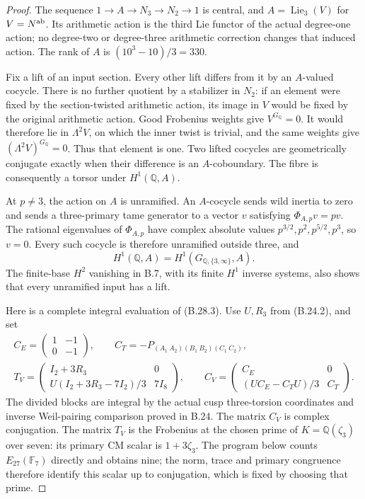 \begin{proof}
The sequence $1\to A\to N_3\to N_2\to1$ is central,
and $A=\operatorname{Lie}_3(V)$ for $V=N^{\rm ab}$.
Its arithmetic action is the third Lie functor of the
actual degree-one action; no degree-two or degree-three
arithmetic correction changes that induced action.
The rank of $A$ is $(10^3-10)/3=330$.

Fix a lift of an input section. Every other lift differs
from it by an $A$-valued cocycle. There is no further
quotient by a stabilizer in $N_2$: if an element were fixed
by the section-twisted arithmetic action, its image in $V$
would be fixed by the original arithmetic action.
Good Frobenius weights give $V^{G_{\mathbb Q}}=0$.
It would therefore lie in $\Lambda^2V$, on which the inner
twist is trivial, and the same weights give
$(\Lambda^2V)^{G_{\mathbb Q}}=0$.
Thus that element is one. Two lifted cocycles are
geometrically conjugate exactly when their difference is
an $A$-coboundary. The fibre is consequently a torsor
under $H^1(\mathbb Q,A)$.

At $p\ne3$, the action on $A$ is unramified. An
$A$-cocycle sends wild inertia to zero and sends a
three-primary tame generator to a vector $v$ satisfying
$\Phi_{A,p}v=pv$. The rational eigenvalues of
$\Phi_{A,p}$ have complex absolute values
$p^{3/2},p^2,p^{5/2},p^3$, so $v=0$.
Every such cocycle is therefore unramified outside three,
and
\[
 H^1(\mathbb Q,A)=H^1(G_{\mathbb Q,\{3,\infty\}},A).
                                                               \tag{B.28.3}
\]
The finite-base $H^2$ vanishing in B.7, with its finite
$H^1$ inverse systems, also shows that every unramified
input has a lift.

Here is a complete integral evaluation of (B.28.3).
Use $U,R_3$ from (B.24.2), and set
\[
 \begin{gathered}
 C_E=\begin{pmatrix}1&-1\\0&-1\end{pmatrix},\qquad
 C_T=-P_{(A_1\ A_2)(B_1\ B_2)(C_1\ C_2)},\\
 T_V=\begin{pmatrix}
 I_2+3R_3&0\\
 U(I_2+3R_3-7I_2)/3&7I_8
 \end{pmatrix},\qquad
 C_V=\begin{pmatrix}
 C_E&0\\(UC_E-C_TU)/3&C_T
 \end{pmatrix}.
 \end{gathered}                                                 \tag{B.28.4}
\]
The divided blocks are integral by the actual cusp
three-torsion coordinates and inverse Weil-pairing
comparison proved in B.24. The matrix $C_V$ is complex
conjugation. The matrix $T_V$ is the Frobenius at the
chosen prime of $K=\mathbb Q(\zeta_3)$ over seven:
its primary CM scalar is $1+3\zeta_3$.
The program below counts $E_{27}(\mathbb F_7)$ directly
and obtains nine; the norm, trace and primary congruence
therefore identify this scalar up to conjugation,
which is fixed by choosing that prime.


\end{proof}
